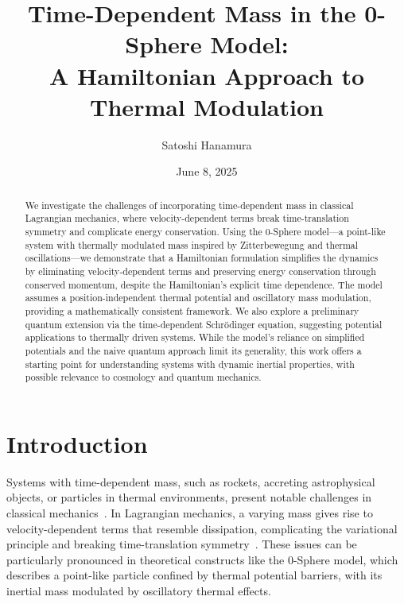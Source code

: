 \documentclass[%
 reprint,
 amsmath,amssymb,
 aps,
]{revtex4-1}
\numberwithin{equation}{section}%
\begin{document}


\title{Time-Dependent Mass in the 0-Sphere Model:\\ 
A Hamiltonian Approach to Thermal Modulation}
\author{Satoshi Hanamura}
\date{June 8, 2025}




%



\begin{abstract}
We investigate the challenges of incorporating time-dependent mass in classical Lagrangian mechanics, where velocity-dependent terms break time-translation symmetry and complicate energy conservation. Using the 0-Sphere model—a point-like system with thermally modulated mass inspired by Zitterbewegung and thermal oscillations—we demonstrate that a Hamiltonian formulation simplifies the dynamics by eliminating velocity-dependent terms and preserving energy conservation through conserved momentum, despite the Hamiltonian’s explicit time dependence. The model assumes a position-independent thermal potential and oscillatory mass modulation, providing a mathematically consistent framework. We also explore a preliminary quantum extension via the time-dependent Schrödinger equation, suggesting potential applications to thermally driven systems. While the model’s reliance on simplified potentials and the naive quantum approach limit its generality, this work offers a starting point for understanding systems with dynamic inertial properties, with possible relevance to cosmology and quantum mechanics.
\end{abstract}

\maketitle

\section{Introduction}

Systems with time-dependent mass, such as rockets, accreting astrophysical objects, or particles in thermal environments, present notable challenges in classical mechanics~\cite{goldstein2002}. In Lagrangian mechanics, a varying mass gives rise to velocity-dependent terms that resemble dissipation, complicating the variational principle and breaking time-translation symmetry~\cite{landau1976}. These issues can be particularly pronounced in theoretical constructs like the 0-Sphere model, which describes a point-like particle confined by thermal potential barriers, with its inertial mass modulated by oscillatory thermal effects.
\end{document}
